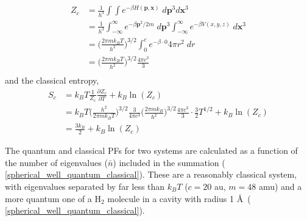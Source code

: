 \documentclass[../main.tex]{subfiles}
\begin{document}
\begin{equation}
\begin{aligned}
Z_c &= \frac{1}{h^{3}}\int\int e^{-\beta H(\boldsymbol{p}, \boldsymbol{x})} \; d\boldsymbol{p}^{3} d\boldsymbol{x}^{3} \\
&= \frac{1}{h^{3}}\int_{-\infty}^\infty e^{-\beta \boldsymbol{p}^2/2m} \; d\boldsymbol{p}^{3} \int_{-\infty}^\infty e^{-\beta V(x, y, z)} \;  d\boldsymbol{x}^{3} \\
&= {\Big (} \frac{2\pi m k_B T}{h^2} {\Big )}^{3/2}  \int_0^c e^{-\beta \cdot 0}  4\pi r^2\;  dr \\
&= {\Big (} \frac{2\pi m k_B T}{h^2} {\Big )}^{3/2} \frac{4\pi c^3}{3} \\
\end{aligned}
\end{equation}
and the classical entropy,
\begin{equation}
\begin{aligned}
S_c &= k_B T \frac{1}{Z_c} \frac{\partial Z_c}{\partial T} + k_B \ln(Z_c) \\
&= k_B T {\Big (} \frac{h^2}{2\pi m k_B T} {\Big )}^{3/2} \frac{3}{4\pi c^3} {\Big (} \frac{2\pi m k_B}{h^2} {\Big )}^{3/2} \frac{4\pi c^3}{3}\cdot \frac{3}{2}T^{1/2} + k_B \ln(Z_c) \\
&= \frac{3k_B}{2} + k_B \ln(Z_c)
\end{aligned}
\end{equation}

The quantum and classical PFs for two systems are calculated as a function of the number of eigenvalues ($\bar{n}$) included in the summation (\figurename{ \ref{spherical_well_quantum_classical}}). These are a reasonably classical system, with eigenvalues separated by far less than $k_BT$ ($c = 20$ au, $m = 48$ amu) and a more quantum one of a H$_2$ molecule in a cavity with radius 1 \AA~(\figurename{ \ref{spherical_well_quantum_classical}}).
\end{document}
